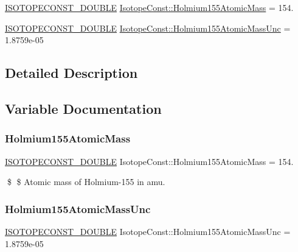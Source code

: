 \begin{DoxyCompactItemize}
\item 
\mbox{\hyperlink{group___isotope_const-_macros_ga8f45a7272ce02c0b4c65c44636ed719a}{I\+S\+O\+T\+O\+P\+E\+C\+O\+N\+S\+T\+\_\+\+D\+O\+U\+B\+LE}} \mbox{\hyperlink{group___isotope_const-_holmium-_ho155_gaa15f33592e6cddb422159a52d1fbcd99}{Isotope\+Const\+::\+Holmium155\+Atomic\+Mass}} = 154.
\item 
\mbox{\hyperlink{group___isotope_const-_macros_ga8f45a7272ce02c0b4c65c44636ed719a}{I\+S\+O\+T\+O\+P\+E\+C\+O\+N\+S\+T\+\_\+\+D\+O\+U\+B\+LE}} \mbox{\hyperlink{group___isotope_const-_holmium-_ho155_gae7cfc492d33936cacb6711d3a3e6e5cc}{Isotope\+Const\+::\+Holmium155\+Atomic\+Mass\+Unc}} = 1.\+8759e-\/05
\end{DoxyCompactItemize}


\subsection{Detailed Description}


\subsection{Variable Documentation}
\mbox{\label{group___isotope_const-_holmium-_ho155_gaa15f33592e6cddb422159a52d1fbcd99}} 
\subsubsection{\texorpdfstring{Holmium155\+Atomic\+Mass}{Holmium155AtomicMass}}
{\footnotesize\ttfamily \mbox{\hyperlink{group___isotope_const-_macros_ga8f45a7272ce02c0b4c65c44636ed719a}{I\+S\+O\+T\+O\+P\+E\+C\+O\+N\+S\+T\+\_\+\+D\+O\+U\+B\+LE}} Isotope\+Const\+::\+Holmium155\+Atomic\+Mass = 154.}

\$ \$ Atomic mass of Holmium-\/155 in amu. \mbox{\label{group___isotope_const-_holmium-_ho155_gae7cfc492d33936cacb6711d3a3e6e5cc}} 
\subsubsection{\texorpdfstring{Holmium155\+Atomic\+Mass\+Unc}{Holmium155AtomicMassUnc}}
{\footnotesize\ttfamily \mbox{\hyperlink{group___isotope_const-_macros_ga8f45a7272ce02c0b4c65c44636ed719a}{I\+S\+O\+T\+O\+P\+E\+C\+O\+N\+S\+T\+\_\+\+D\+O\+U\+B\+LE}} Isotope\+Const\+::\+Holmium155\+Atomic\+Mass\+Unc = 1.\+8759e-\/05}

